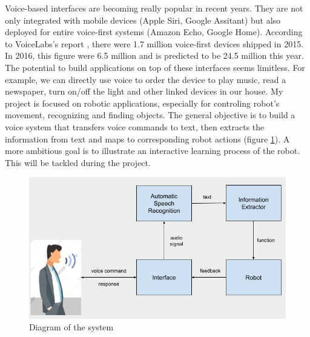 Voice-based interfaces are becoming really popular in recent years. They are not only integrated with mobile devices (Apple Siri, Google Assitant) but also deployed for entire voice-first systems (Amazon Echo, Google Home). According to VoiceLabs's report \cite{VoiceLabs:2017}, there were 1.7 million voice-first devices shipped in 2015. In 2016, this figure were 6.5 million and is predicted to be 24.5 million this year. The potential to build applications on top of these interfaces seems limitless. For example, we can directly use voice to order the device to play music, read a newspaper, turn on/off the light and other linked devices in our house. My project is focused on robotic applications, especially for controling robot's movement, recognizing and finding objects. The general objective is to build a voice system that transfers voice commands to text, then extracts the information from text and maps to corresponding robot actions (figure \ref{fig:diagramSystem}). A more ambitious goal is to illustrate an interactive learning process of the robot. This will be tackled during the project.
\begin{figure}[tb]
\centering
\includegraphics[width = 0.7\hsize]{./figures/diagramSystem}
\caption{Diagram of the system}
\label{fig:diagramSystem}
\end{figure}


%
%
